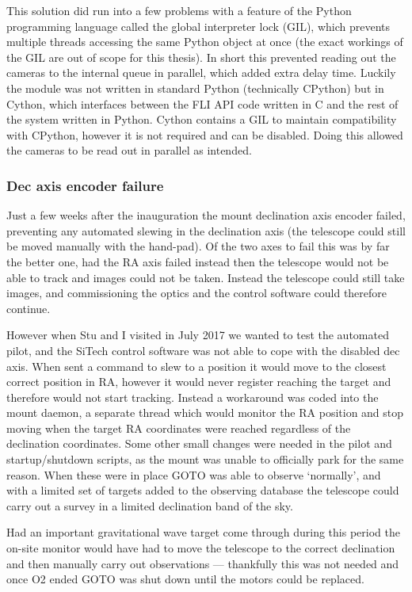 \begin{colsection}
\begin{colsection}
This solution did run into a few problems with a feature of the Python programming language called the global interpreter lock (GIL), which prevents multiple threads accessing the same Python object at once (the exact workings of the GIL are out of scope for this thesis). In short this prevented reading out the cameras to the internal queue in parallel, which added extra delay time. Luckily the  module was not written in standard Python (technically CPython) but in Cython, which interfaces between the FLI API code written in C and the rest of the system written in Python. Cython contains a GIL to maintain compatibility with CPython, however it is not required and can be disabled. Doing this allowed the cameras to be read out in parallel as intended.

\subsubsection{Dec axis encoder failure}

Just a few weeks after the inauguration the mount declination axis encoder failed, preventing any automated slewing in the declination axis (the telescope could still be moved manually with the hand-pad). Of the two axes to fail this was by far the better one, had the RA axis failed instead then the telescope would not be able to track and images could not be taken. Instead the telescope could still take images, and commissioning the optics and the control software could therefore continue.

However when Stu and I visited in July 2017 we wanted to test the automated pilot, and the SiTech control software was not able to cope with the disabled dec axis. When sent a command to slew to a position it would move to the closest correct position in RA, however it would never register reaching the target and therefore would not start tracking. Instead a workaround was coded into the mount daemon, a separate thread which would monitor the RA position and stop moving when the target RA coordinates were reached regardless of the declination coordinates. Some other small changes were needed in the pilot and startup/shutdown scripts, as the mount was unable to officially park for the same reason. When these were in place GOTO was able to observe `normally', and with a limited set of targets added to the observing database the telescope could carry out a survey in a limited declination band of the sky.

Had an important gravitational wave target come through during this period the on-site monitor would have had to move the telescope to the correct declination and then manually carry out observations --- thankfully this was not needed and once O2 ended GOTO was shut down until the motors could be replaced.


\end{colsection}
\end{colsection}

